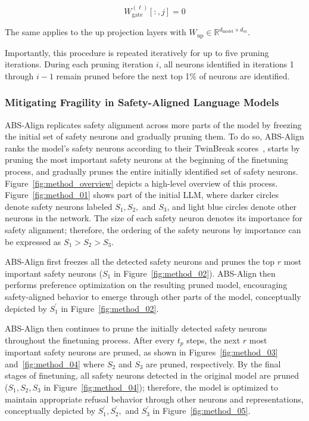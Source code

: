 \begin{equation*}
    W^{(\ell)}_\text{gate}[:,j] = 0
\end{equation*}

The same applies to the up projection layers with $W_\text{up} \in \mathbb{R}^{d_\text{model} \times d_m}$. 

Importantly, this procedure is repeated iteratively for up to five pruning iterations. During each pruning iteration $i$, all neurons identified in iterations 1 through $i-1$ remain pruned before the next top 1\% of neurons are identified.



\subsubsection{Mitigating Fragility in Safety-Aligned Language Models}
\label{subsubsec:denser_safety}


ABS-Align replicates safety alignment across more parts of the model by freezing the initial set of safety neurons and gradually pruning them. To do so, ABS-Align ranks the model's safety neurons according to their TwinBreak scores~\cite{twinbreak}, starts by pruning the most important safety neurons at the beginning of the finetuning process, and gradually prunes the entire initially identified set of safety neurons. Figure~\ref{fig:method_overview} depicts a high-level overview of this process. Figure~\ref{fig:method_01} shows part of the initial LLM, where darker circles denote safety neurons labeled $S_1, S_2,$ and $S_3$, and light blue circles denote other neurons in the network. The size of each safety neuron denotes its importance for safety alignment; therefore, the ordering of the safety neurons by importance can be expressed as $S_1 > S_2 > S_3$.

ABS-Align first freezes all the detected safety neurons and prunes the top $r$ most important safety neurons ($S_1$ in Figure~\ref{fig:method_02}). ABS-Align then performs preference optimization on the resulting pruned model, encouraging safety-aligned behavior to emerge through other parts of the model, conceptually depicted by $S^\prime_1$ in Figure~\ref{fig:method_02}.


ABS-Align then continues to prune the initially detected safety neurons throughout the finetuning process. After every $t_p$ steps, the next $r$ most important safety neurons are pruned, as shown in Figures~\ref{fig:method_03} and~\ref{fig:method_04} where $S_2$ and $S_3$ are pruned, respectively. By the final stages of finetuning, all safety neurons detected in the original model are pruned ($S_1, S_2, S_3$ in Figure~\ref{fig:method_04}); therefore, the model is optimized to maintain appropriate refusal behavior through other neurons and representations, conceptually depicted by $S^\prime_1, S^\prime_2,$ and $S^\prime_3$ in Figure~\ref{fig:method_05}.


